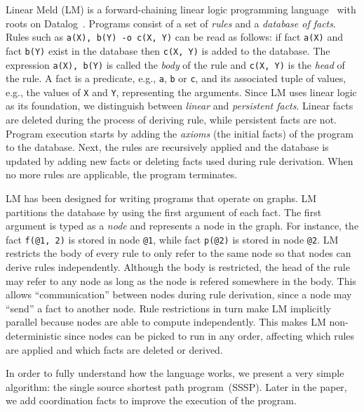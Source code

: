 Linear Meld (LM) is a forward-chaining linear logic programming
language~\cite{cruz-iclp14} with roots on Datalog~\cite{Ramakrishnan93asurvey}.
Programs consist of a set of \emph{rules} and a \emph{database of facts}.
Rules such as \texttt{a(X), b(Y) -o c(X, Y)} can be read as follows: if fact \texttt{a(X)}
and fact \texttt{b(Y)} exist in the database then \texttt{c(X, Y)} is added to
the database. The expression \texttt{a(X), b(Y)} is called the \emph{body} of
the rule and \texttt{c(X, Y)} is the \emph{head} of the rule.
A fact is a predicate, e.g., \texttt{a}, \texttt{b} or \texttt{c}, and its
associated tuple of values, e.g., the values of \texttt{X} and \texttt{Y}, representing the
arguments. Since LM uses linear logic as its foundation, we distinguish between
\emph{linear} and \emph{persistent facts}. Linear facts are deleted during the
process of deriving rule, while persistent facts are not.
Program execution starts by adding the \emph{axioms} (the initial facts) of the program to the database.
Next, the rules are recursively applied and the database is updated by adding
new facts or deleting facts used during rule derivation.
When no more rules are applicable, the program terminates.

\newcommand{\scare}[1]{``#1''} 

LM has been designed for writing programs that operate on graphs. LM partitions
the database by using the first argument of each fact. The first argument is
typed as a \emph{node} and represents a node in the graph. For instance, the
fact \texttt{f(@1, 2)} is stored in node \texttt{@1}, while fact \texttt{p(@2)}
is stored in node \texttt{@2}. LM restricts
the body of every rule to only refer to the same node so that nodes can derive
rules independently. Although the body is restricted, the head of the
rule may refer to any node as long as the node is refered somewhere in the
body. This allows \scare{communication} between nodes during rule derivation, since a
node may \scare{send} a fact to another node.
Rule restrictions in turn make LM implicitly parallel because nodes are able to
compute independently. This makes LM non-deterministic since nodes can be picked
to run in any order, affecting which rules are applied and which facts are
deleted or derived.

In order to fully understand how the language works, we present a very simple
algorithm: the single source shortest path program~(SSSP). Later in the paper, we
add coordination facts to improve the execution of the program.

